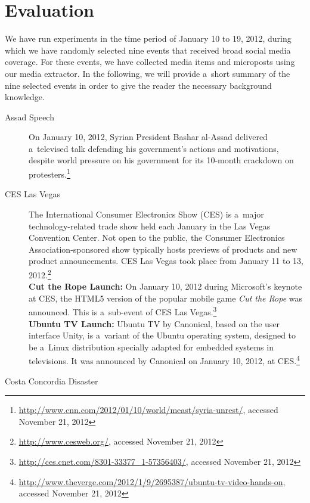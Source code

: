 \section{Evaluation}

We have run experiments in the time period of January 10 to 19, 2012,
during which we have randomly selected nine events
that received broad social media coverage.
For these events, we have collected media items and microposts
using our media extractor.
In the following, we will provide a~short summary of the nine selected events
in order to give the reader the necessary background knowledge.

\begin{description}
  \item[Assad Speech]
       On January 10, 2012, Syrian President Bashar al-Assad
       delivered a~televised talk defending his
       government's actions and motivations, despite world
       pressure on his government for its 10-month
       crackdown on
       protesters.\footnote{\url{http://www.cnn.com/2012/01/10/world/meast/syria-unrest/},
       accessed November 21, 2012}
  \item[CES Las Vegas]
       The International Consumer Electronics Show (CES) is
       a~major technology-related trade show held each January
       in the Las Vegas Convention Center. Not open to the public,
       the Consumer Electronics Association-sponsored show
       typically hosts previews of products and new product
       announcements.
       CES Las Vegas took place from January 11 to 13,
       2012.\footnote{\url{http://www.cesweb.org/},
       accessed November 21, 2012}\\
       \textbf{Cut the Rope Launch:}
       On January 10, 2012 during Microsoft's keynote at CES, the
       HTML5 version of the popular mobile game \textit{Cut the
       Rope} was announced. This is a~sub-event of CES Las
       Vegas.\footnote{\url{http://ces.cnet.com/8301-33377_1-57356403/},
       accessed November 21, 2012}\\       
       \textbf{Ubuntu TV Launch:}
       Ubuntu TV by Canonical, based on the user interface Unity,
       is a~variant of the Ubuntu operating system, designed to be
       a~Linux distribution specially adapted for embedded systems
       in televisions. It was announced by Canonical on January
       10, 2012, at
       CES.\footnote{\url{http://www.theverge.com/2012/1/9/2695387/ubuntu-tv-video-hands-on},
       accessed November 21, 2012}       
  \item[Costa Concordia Disaster]

\end{description}
